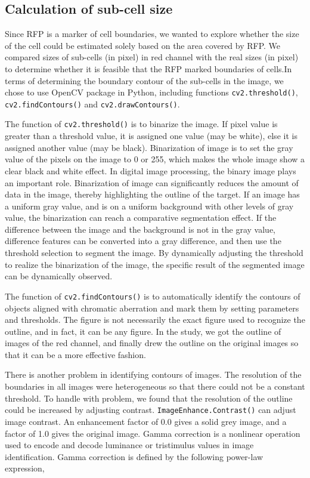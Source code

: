 \documentclass[12pt]{article}
\begin{document}
\subsection*{Calculation of sub-cell size}
\par Since RFP is a marker of cell boundaries, we wanted to explore whether the size of the cell could be estimated solely based on the area covered by RFP. We compared sizes of sub-cells (in pixel) in red channel with the real sizes (in pixel) to determine whether it is feasible that the RFP marked boundaries of cells.In terms of determining the boundary contour of the sub-cells in the image, we chose to use OpenCV package in Python, including functions \lstinline|cv2.threshold()|, \lstinline|cv2.findContours()| and \lstinline|cv2.drawContours()|.
\par The function of \lstinline|cv2.threshold()| is to binarize the image. If pixel value is greater than a threshold value, it is assigned one value (may be white), else it is assigned another value (may be black).  Binarization of image is to set the gray value of the pixels on the image to 0 or 255, which makes the whole image show a clear black and white effect. In digital image processing, the binary image plays an important role. Binarization of image can significantly reduces the amount of data in the image, thereby highlighting the outline of the target. If an image has a uniform gray value, and is on a uniform background with other levels of gray value, the binarization can reach a comparative segmentation effect. If the difference between the image and the background is not in the gray value, difference features can be converted into a gray difference, and then use the threshold selection to segment the image. By dynamically adjusting the threshold to realize the binarization of the image, the specific result of the segmented image can be dynamically observed.
\par The function of \lstinline|cv2.findContours()| is to automatically identify the contours of objects aligned with chromatic aberration and mark them by setting parameters and thresholds. The figure is not necessarily the exact figure used to recognize the outline, and in fact, it can be any figure. In the study, we got the outline of images of the red channel, and finally drew the outline on the original images so that it can be a more effective fashion.
\par There is another problem in identifying contours of images. The resolution of the boundaries in all images were heterogeneous so that there could not be a constant threshold. To handle with problem, we found that the resolution of the outline could be increased by adjusting contrast. \lstinline|ImageEnhance.Contrast()| can adjust image contrast. An enhancement factor of 0.0 gives a solid grey image, and a factor of 1.0 gives the original image. Gamma correction is a nonlinear operation used to encode and decode luminance or tristimulus values in image identification. Gamma correction is defined by the following power-law expression,
\end{document}
